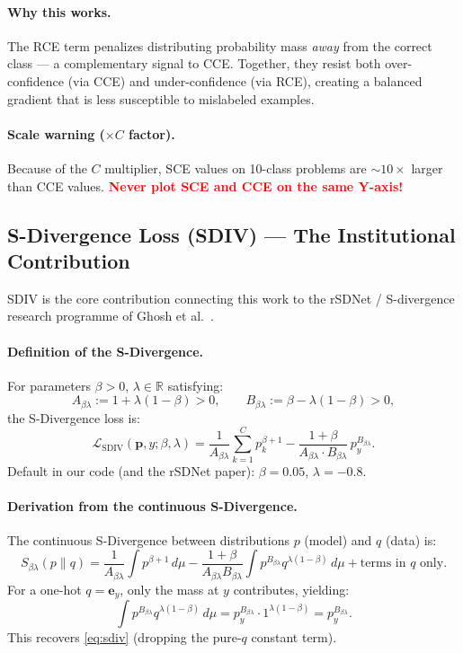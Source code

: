 \documentclass[11pt,a4paper]{article}
\newcommand{\R}{\mathbb{R}}
\newcommand{\Lcal}{\mathcal{L}}
\newcommand{\py}{p_y}
\newcommand{\pb}{\mathbf{p}}
\newcommand{\eb}{\mathbf{e}}
\newcommand{\Asd}{A_{\beta\lambda}}
\newcommand{\Bsd}{B_{\beta\lambda}}
\begin{document}
\paragraph{Why this works.}
The RCE term penalizes distributing probability mass \emph{away} from the correct class —
a complementary signal to CCE. Together, they resist both over-confidence (via CCE)
and under-confidence (via RCE), creating a balanced gradient that is less susceptible
to mislabeled examples.

\paragraph{Scale warning ($\times C$ factor).}
Because of the $C$ multiplier, SCE values on 10-class problems are $\sim 10\times$ larger
than CCE values. \textcolor{red}{\textbf{Never plot SCE and CCE on the same Y-axis!}}

\subsection{S-Divergence Loss (SDIV) — The Institutional Contribution}
\label{sec:sdiv}

SDIV is the core contribution connecting this work to the rSDNet / S-divergence
research programme of Ghosh et al.\ \cite{ghosh2017bern}.

\paragraph{Definition of the S-Divergence.}
For parameters $\beta > 0$, $\lambda \in \R$ satisfying:
\[
  \Asd := 1 + \lambda(1-\beta) > 0, \qquad \Bsd := \beta - \lambda(1-\beta) > 0,
\]
the S-Divergence loss is:
\begin{equation}
  \label{eq:sdiv}
  \boxed{
  \Lcal_{\mathrm{SDIV}}(\pb, y; \beta, \lambda)
  = \frac{1}{\Asd}\sum_{k=1}^C p_k^{\beta+1}
  - \frac{1+\beta}{\Asd \cdot \Bsd}\,\py^{\Bsd}.
  }
\end{equation}
Default in our code (and the rSDNet paper): $\beta=0.05$, $\lambda=-0.8$.

\paragraph{Derivation from the continuous S-Divergence.}
The continuous S-Divergence between distributions $p$ (model) and $q$ (data) is:
\[
  S_{\beta\lambda}(p\|q) = \frac{1}{\Asd}\int p^{\beta+1}\,d\mu
  - \frac{1+\beta}{\Asd \Bsd}\int p^{\Bsd} q^{\lambda(1-\beta)}\,d\mu
  + \text{terms in }q\text{ only}.
\]
For a one-hot $q = \eb_y$, only the mass at $y$ contributes, yielding:
\[
  \int p^{\Bsd} q^{\lambda(1-\beta)}\,d\mu = p_y^{\Bsd} \cdot 1^{\lambda(1-\beta)} = p_y^{\Bsd}.
\]
This recovers \cref{eq:sdiv} (dropping the pure-$q$ constant term).
\end{document}
